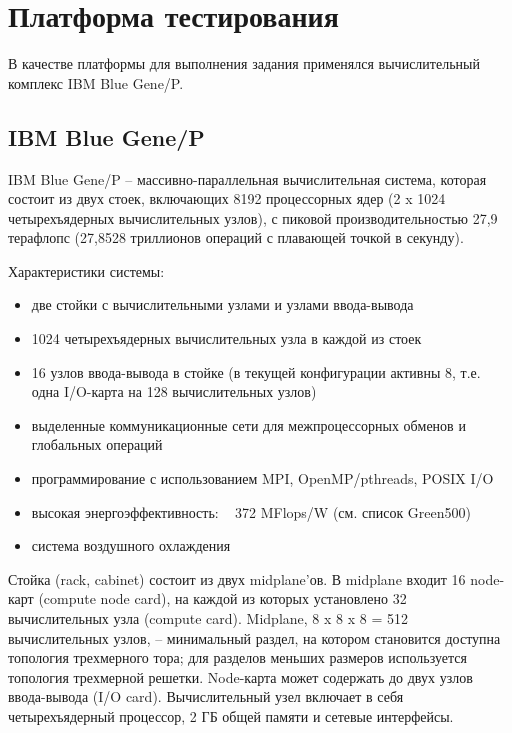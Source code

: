 \documentclass[12pt, a4paper]{article}
\begin{document}
    \section{Платформа тестирования}
        В качестве платформы для выполнения задания применялся вычислительный комплекс IBM Blue Gene/P.
        \subsection{IBM Blue Gene/P}
            IBM Blue Gene/P -- массивно-параллельная вычислительная система, которая состоит из двух стоек, включающих 8192 процессорных ядер (2 x 1024 четырехъядерных вычислительных узлов), с пиковой производительностью 27,9 терафлопс (27,8528 триллионов операций с плавающей точкой в секунду).

            Характеристики системы:
            \begin{itemize}[leftmargin=1.5cm]
                \item две стойки с вычислительными узлами и узлами ввода-вывода
                \item 1024 четырехъядерных вычислительных узла в каждой из стоек
                \item 16 узлов ввода-вывода в стойке (в текущей конфигурации активны 8, т.е. одна I/O-карта на 128 вычислительных узлов)
                \item выделенные коммуникационные сети для межпроцессорных обменов и глобальных операций
                \item программирование с использованием MPI, OpenMP/pthreads, POSIX I/O
                \item высокая энергоэффективность: ~ 372 MFlops/W (см. список Green500)
                \item система воздушного охлаждения
            \end{itemize}

            Стойка (rack, cabinet) состоит из двух midplane'ов. В midplane входит 16 node-карт (compute node card), на каждой из которых установлено 32 вычислительных узла (compute card). Midplane, 8 x 8 x 8 = 512 вычислительных узлов, -- минимальный раздел, на котором становится доступна топология трехмерного тора; для разделов меньших размеров используется топология трехмерной решетки. Node-карта может содержать до двух узлов ввода-вывода (I/O card). Вычислительный узел включает в себя четырехъядерный процессор, 2 ГБ общей памяти и сетевые интерфейсы.
\end{document}
